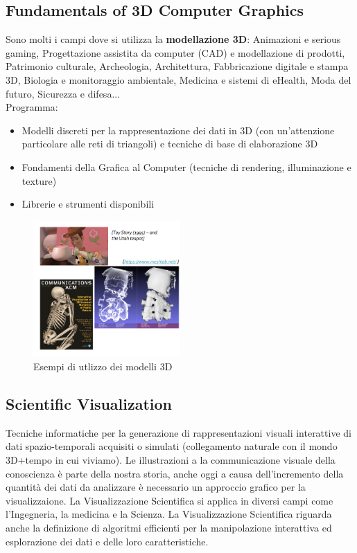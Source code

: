 \subsection{Fundamentals of 3D Computer Graphics}
Sono molti i campi dove si utilizza la \textbf{modellazione 3D}: 
Animazioni e serious gaming, 
Progettazione assistita da computer (CAD) e modellazione di prodotti, 
Patrimonio culturale, Archeologia, Architettura, Fabbricazione digitale e stampa 3D, Biologia e monitoraggio ambientale, 
Medicina e sistemi di eHealth, Moda del futuro, Sicurezza e difesa...
\\ Programma:
\begin{itemize}
\item  Modelli discreti per la rappresentazione dei dati in 3D (con un'attenzione particolare alle reti di triangoli) e tecniche di base di elaborazione 3D
\item Fondamenti della Grafica al Computer (tecniche di rendering, illuminazione e texture)
\item  Librerie e strumenti disponibili
\end{itemize}
\begin{figure}[H]
    \centering
    \includegraphics[width=0.5\textwidth]{images/3Dexp.png} %
    \caption{Esempi di utlizzo dei modelli 3D}
    \label{fig:immagine}
\end{figure}
\subsection{Scientific Visualization}
Tecniche informatiche per la generazione di rappresentazioni visuali interattive di dati spazio-temporali acquisiti o simulati 
(collegamento naturale con il mondo 3D+tempo in cui viviamo). Le illustrazioni a la communicazione visuale della conoscienza è parte della nostra storia, anche oggi a causa dell'incremento 
della quantità dei dati da analizzare è necessario un approccio grafico per la visualizzaione.
La Visualizzazione Scientifica si applica in diversi campi come l'Ingegneria, la medicina e la Scienza.
La Visualizzazione Scientifica riguarda anche la definizione di algoritmi efficienti per la manipolazione interattiva ed esplorazione dei dati e delle loro caratteristiche.

